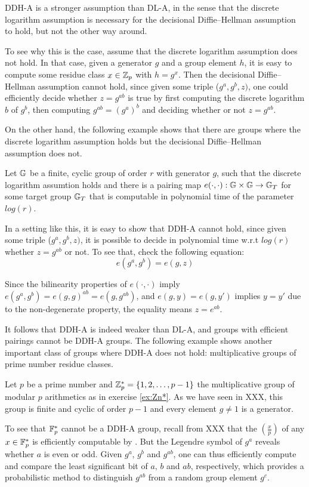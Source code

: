 DDH-A is a stronger assumption than DL-A, in the sense that the discrete logarithm assumption is necessary for the decisional  Diffie--Hellman assumption to hold, but not the other way around.

To see why this is the case, assume that the discrete logarithm assumption does not hold. In that case, given a generator $g$ and a group element $h$, it is easy to compute some residue class $x\in\mathbb{Z}_p$ with $h=g^x$. Then the decisional Diffie--Hellman assumption cannot hold, since given some triple ($ g^a , g^b , z )$, one could efficiently decide whether $z = g^{ab}$ is true by first computing the discrete logarithm $b$ of  $g^b$, then computing $g^{ab}= (g^a)^b$ and deciding whether or not $z=g^{ab}$.

On the other hand, the following example shows that there are groups where the discrete logarithm assumption holds but the decisional  Diffie--Hellman assumption does not.
\begin{example} Let $\mathbb{G}$ be a finite, cyclic group of order $r$ with generator $g$, such that the discrete logarithm assumtion holds and there is a pairing map $e(\cdot,\cdot): \mathbb{G} \times \mathbb{G} \to \mathbb{G}_T$ for some target group $\mathbb{G}_T$ that is computable in polynomial time of the parameter $log(r)$.

In a setting like this, it is easy to show that DDH-A cannot hold, since given some  triple ($ g^a , g^b , z )$, it is possible to decide in polynomial time w.r.t $log(r)$ whether $z=g^{ab}$ or not. To see that, check the following equation:
\begin{equation}
e(g^a,g^b)=e(g,z)
\end{equation}

Since the bilinearity properties of $e(\cdot,\cdot)$ imply $e(g^a,g^b)= e(g,g)^{ab}= e(g,g^{ab})$, and $e(g,y)=e(g,y')$ implies $y=y'$ due to the non-degenerate property, the equality means $z=e^{ab}$.
\end{example}
It follows that DDH-A is indeed weaker than DL-A, and groups with efficient pairings cannot be DDH-A groups. The following example shows another important class of groups where DDH-A does not hold: multiplicative groups of prime number residue classes.
\begin{example}Let $p$ be a prime number and $\mathbb{Z}_p^*=\{1,2,\ldots,p-1\}$ the multiplicative group of modular $p$ arithmetics as in exercise \ref{ex:Zn*}. As we have seen in XXX, this group is finite and cyclic of order $p-1$ and every element $g\neq 1$ is a generator.

To see that $\mathbb{F}_p^*$ cannot be a DDH-A group, recall from XXX that the  $\left(\frac{x}{p}\right)$ of any $x\in \mathbb{F}_p^*$ is efficiently computable by . But the  Legendre symbol of $g^{a}$ reveals whether $a$ is even or odd. Given $g^{a}$, $g^{b}$ and $g^{ab}$, one can thus efficiently compute and compare the least significant bit of $a$, $b$ and $a b$, respectively, which provides a probabilistic method to distinguish $g^{ab}$ from a random group element $g^c$.
\end{example}
